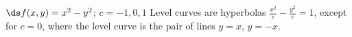 {$\ds f(x,y) = x^2-y^2$; $c = -1,0,1$}
{Level curves are hyperbolas $\frac{x^2}{c}-\frac{y^2}{c}=1$, except for $c=0$, where the level curve is the pair of lines $y=x$, $y=-x$.\\
}